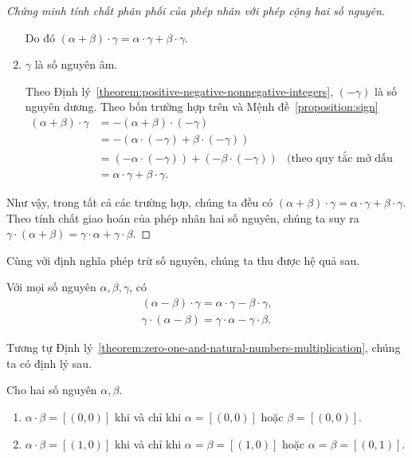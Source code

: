 \begin{proof}[Chứng minh tính chất phân phối của phép nhân với phép cộng hai số nguyên]
\begin{enumerate}[label={\textbf{Trường hợp \arabic*.}},itemindent=1.7cm]
              Do đó $(\alpha + \beta)\cdot\gamma = \alpha\cdot\gamma + \beta\cdot\gamma$.
        \item $\gamma$ là số nguyên âm.

              Theo Định lý~\ref{theorem:positive-negative-nonnegative-integers}, $(-\gamma)$ là số nguyên dương. Theo bốn trường hợp trên và Mệnh đề~\ref{proposition:sign}
              \begin{align*}
                  (\alpha + \beta)\cdot\gamma & = -(\alpha+\beta)\cdot(-\gamma)                                                         \\
                                              & = -(\alpha\cdot(-\gamma) + \beta\cdot(-\gamma))                                         \\
                                              & = (-\alpha\cdot(-\gamma)) + (-\beta\cdot(-\gamma)) & \text{(theo quy tắc mở dấu ngoặc)} \\
                                              & = \alpha\cdot\gamma + \beta\cdot\gamma.
              \end{align*}
    \end{enumerate}

    Như vậy, trong tất cả các trường hợp, chúng ta đều có $(\alpha + \beta)\cdot\gamma = \alpha\cdot\gamma + \beta\cdot\gamma$. Theo tính chất giao hoán của phép nhân hai số nguyên, chúng ta suy ra $\gamma\cdot(\alpha+\beta) = \gamma\cdot\alpha + \gamma\cdot\beta$.
\end{proof}

Cùng với định nghĩa phép trừ số nguyên, chúng ta thu được hệ quả sau.
\begin{corollary}
    Với mọi số nguyên $\alpha, \beta, \gamma$, có
    \[
        \begin{split}
            (\alpha - \beta)\cdot\gamma = \alpha\cdot\gamma - \beta\cdot\gamma, \\
            \gamma\cdot(\alpha - \beta) = \gamma\cdot\alpha - \gamma\cdot\beta.
        \end{split}
    \]
\end{corollary}

Tương tự Định lý~\ref{theorem:zero-one-and-natural-numbers-multiplication}, chúng ta có định lý sau.
\begin{theorem}\label{theorem:product-of-integers-are-zero-or-one}
    Cho hai số nguyên $\alpha, \beta$.
    \begin{enumerate}[label={(\roman*)}]
        \item $\alpha\cdot\beta = [(0,0)]$ khi và chỉ khi $\alpha = [(0,0)]$ hoặc $\beta = [(0,0)]$.
        \item $\alpha\cdot\beta = [(1,0)]$ khi và chỉ khi $\alpha = \beta = [(1, 0)]$ hoặc $\alpha = \beta = [(0,1)]$.
    \end{enumerate}
\end{theorem}

